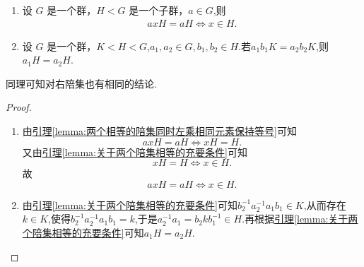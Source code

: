 \documentclass[../../main.tex]{subfiles}
\begin{document}
\begin{corollary}\label{corollary:关于两个陪集相等的充要条件推论}
\begin{enumerate}[(1)]
\item 设 \(G\) 是一个群，\(H < G\) 是一个子群，\(a \in G\),则
\begin{align*}
axH=aH \iff x\in H.
\end{align*}

\item 设 \(G\) 是一个群，$K<H<G$,$a_1,a_2\in G,b_1,b_2 \in H$.若$a_1b_1K=a_2b_2K$,则$a_1H=a_2H$.
\end{enumerate}
\end{corollary}
\begin{note}
同理可知对右陪集也有相同的结论.
\end{note}
\begin{proof}
\begin{enumerate}[(1)]
\item 由\hyperref[lemma:两个相等的陪集同时左乘相同元素保持等号]{引理\ref{lemma:两个相等的陪集同时左乘相同元素保持等号}}可知\[axH=aH \iff xH=H.\]
又由\hyperref[lemma:关于两个陪集相等的充要条件]{引理\ref{lemma:关于两个陪集相等的充要条件}}可知\[xH=H \iff x\in H.\]故\[axH=aH \iff x\in H.\]

\item 由\hyperref[lemma:关于两个陪集相等的充要条件]{引理\ref{lemma:关于两个陪集相等的充要条件}}可知$b_{2}^{-1}a_{2}^{-1}a_1b_1\in K$,从而存在$k\in K$,使得$b_{2}^{-1}a_{2}^{-1}a_1b_1=k$,于是$a_2^{-1}a_1=b_2kb_{1}^{-1}\in H.$再根据\hyperref[lemma:关于两个陪集相等的充要条件]{引理\ref{lemma:关于两个陪集相等的充要条件}}可知$a_1H=a_2H.$
\end{enumerate}
\end{proof}
\end{document}
